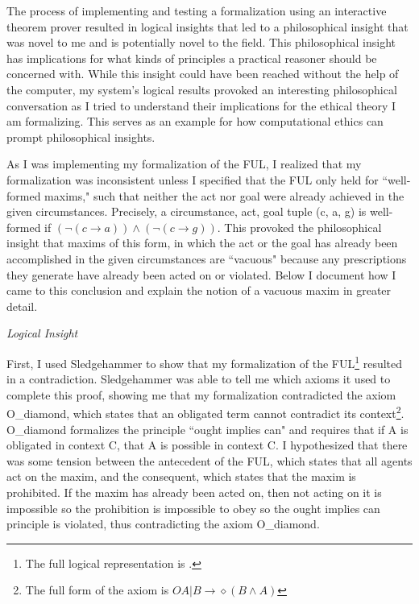 \begin{isabellebody}
%
\endisadelimdocument
%
\begin{isamarkuptext}%
The process of implementing and testing a formalization using an interactive theorem prover 
resulted in logical insights that led to a philosophical 
insight that was novel to me and is potentially novel to the field. This philosophical insight has
implications for what kinds of principles a practical reasoner should be concerned with. While this 
insight could have been reached without the help of the computer, my system's logical results provoked
an interesting philosophical conversation as I tried to understand their implications for the ethical 
theory I am formalizing. This serves as an example for how computational ethics can prompt philosophical 
insights. 

As I was implementing my formalization of the FUL, I realized
that my formalization was inconsistent unless I specified that the FUL only held for ``well-formed maxims,"
such that neither the act nor goal were already achieved in the given circumstances. Precisely, 
a circumstance, act, goal tuple (c, a, g) is well-formed if $(\neg (c \longrightarrow a) ) \wedge 
(\neg(c \longrightarrow g))$. This provoked the philosophical insight that maxims of this form, in which 
the act or the goal has already been accomplished in the given circumstances are ``vacuous" because 
any prescriptions they generate have already been acted on or violated. Below I document how I came 
to this conclusion and explain the notion of a vacuous maxim in greater detail.

\emph{Logical Insight}

First, I used Sledgehammer to show that my formalization of the FUL\footnote{The full logical representation is .}
resulted in a contradiction. Sledgehammer was able to tell me which axioms it used to complete 
this proof, showing me that my formalization contradicted the axiom O\_diamond, which states that an 
obligated term cannot contradict its context\footnote{The full form of the axiom is 
$ O { A \vert B } \longrightarrow \diamond (B \wedge A)$}. 
O\_diamond formalizes the principle ``ought implies can" and requires that if A is obligated in context 
C, that A is possible in context C. I hypothesized that there was some tension between 
the antecedent of the FUL, which states that all agents act on the maxim, and the consequent, 
which states that the maxim is prohibited. If the maxim has already been acted on, then not acting on it
is impossible so the prohibition is impossible to obey so the ought implies can principle is violated, 
thus contradicting the axiom O\_diamond.


\end{isamarkuptext}
\end{isabellebody}
